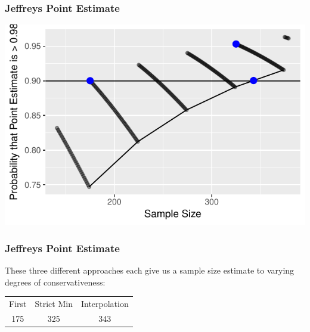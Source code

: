 \documentclass{beamer}\usepackage{knitr}
\begin{document}
\begin{frame}
\frametitle{Jeffreys Point Estimate}
\begin{knitrout}
\color{fgcolor}

{\centering \includegraphics[width=\linewidth]{figure/plot_Jeffreys_4-1} 

}



\end{knitrout}
\end{frame}


\begin{frame}[fragile]
\frametitle{Jeffreys Point Estimate}

These three different approaches each give us a sample size estimate to varying degrees of conservativeness:

\begin{center}
  \begin{tabular}{ccc}
    First & Strict Min & Interpolation \\
    175 & 325 & 343 \\
  \end{tabular}
\end{center}

\end{frame}




% 
\end{document}
